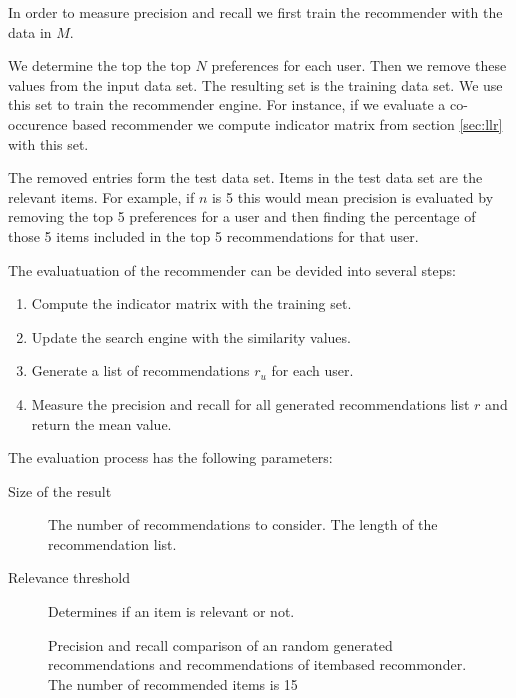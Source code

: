 In order to measure precision and recall we first train the recommender with the data in $M$.

We determine the top the top $N$ preferences for each user. Then we remove these values from the input data set. The resulting set is the training data set. We use this set to train the recommender engine. For instance, if we evaluate a co-occurence based recommender we compute indicator matrix from section \ref{sec:llr} with this set.

The removed entries form the test data set. Items in the test data set are the relevant items. 
For example, if $n$ is 5 this would mean precision is evaluated by removing the top 5 preferences for a user and then finding the percentage of those 5 items included in the top 5 recommendations for that user. 

The evaluatuation of the recommender can be devided into several steps:
\begin{enumerate}
\item  Compute the indicator matrix with the training set.
\item Update the search engine with the similarity values.
\item Generate a list of recommendations $r_u$ for each user.
\item Measure the precision and recall for all generated recommendations list $r$ and return the mean value.
\end{enumerate}

The evaluation process has the following parameters:
\begin{description}
\item[Size of the result] The number of recommendations to consider. The length of the recommendation list.
\item[Relevance threshold] Determines if an item is relevant or not.
\end{description}

\pgfplotsset{width=7cm}
\begin{figure}
  \centering
{} 
  \caption{Precision and recall comparison of an random generated recommendations and recommendations of itembased recommonder. The number of recommended items is 15}
  \label{fig:precisionrecallvalues}
\end{figure}

